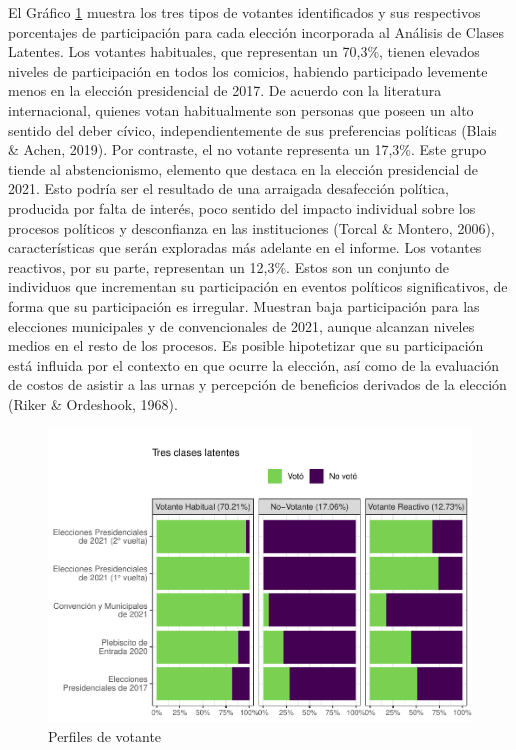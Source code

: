 \documentclass[
  12pt,
]{book}
\begin{document}
El Gráfico \ref{fig:graf-perfiles-3} muestra los tres tipos de votantes identificados y sus respectivos porcentajes de participación para cada elección incorporada al Análisis de Clases Latentes. Los votantes habituales, que representan un 70,3\%, tienen elevados niveles de participación en todos los comicios, habiendo participado levemente menos en la elección presidencial de 2017. De acuerdo con la literatura internacional, quienes votan habitualmente son personas que poseen un alto sentido del deber cívico, independientemente de sus preferencias políticas (Blais \& Achen, 2019). Por contraste, el no votante representa un 17,3\%. Este grupo tiende al abstencionismo, elemento que destaca en la elección presidencial de 2021. Esto podría ser el resultado de una arraigada desafección política, producida por falta de interés, poco sentido del impacto individual sobre los procesos políticos y desconfianza en las instituciones (Torcal \& Montero, 2006), características que serán exploradas más adelante en el informe. Los votantes reactivos, por su parte, representan un 12,3\%. Estos son un conjunto de individuos que incrementan su participación en eventos políticos significativos, de forma que su participación es irregular. Muestran baja participación para las elecciones municipales y de convencionales de 2021, aunque alcanzan niveles medios en el resto de los procesos. Es posible hipotetizar que su participación está influida por el contexto en que ocurre la elección, así como de la evaluación de costos de asistir a las urnas y percepción de beneficios derivados de la elección (Riker \& Ordeshook, 1968).

\begin{figure}

{\centering \includegraphics{reporte-elsoc_files/figure-latex/graf-perfiles-3-1} 

}

\caption{Perfiles de votante}\label{fig:graf-perfiles-3}
\end{figure}
\end{document}

